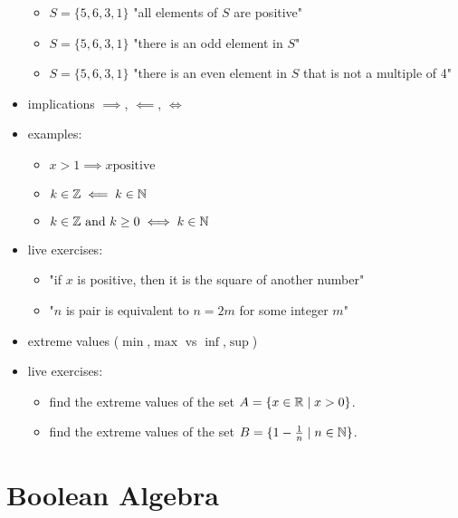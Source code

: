 \begin{itemize}
  \begin{itemize}
  \tightlist
  \item
    \(S = \{5,6,3,1\}\) "all elements of \(S\) are positive"
  \item
    \(S = \{5,6,3,1\}\) "there is an odd element in \(S\)"
  \item
    \(S = \{5,6,3,1\}\) "there is an even element in \(S\) that is not a
    multiple of 4"
  \end{itemize}
\item
  implications \(\implies\), \(\impliedby\), \(\iff\)
\item
  examples:

  \begin{itemize}
  \tightlist
  \item
    \(x>1 \implies x \text{positive}\)
  \item
    \(k \in \mathbb{Z} \impliedby k \in \mathbb{N}\)
  \item
    \(k \in \mathbb{Z}  \text{ and } k\geq 0 \iff k \in \mathbb{N}\)
  \end{itemize}
\item
  live exercises:

  \begin{itemize}
  \tightlist
  \item
    "if \(x\) is positive, then it is the square of another number"
  \item
    "\(n\) is pair is equivalent to \(n=2m\) for some integer \(m\)"
  \end{itemize}
\item
  extreme values (\(\min\),\(\max\) vs \(\inf\),\(\sup\))
\item
  live exercises:

  \begin{itemize}
  \tightlist
  \item
    find the extreme values of the set \(A = \{x \in \mathbb{R} \mid x>0\}\).
  \item
    find the extreme values of the set
    \(B = \{1-\frac{1}{n} \mid n\in \mathbb{N}\}\).
  \end{itemize}
\end{itemize}

\hypertarget{boolean-algebra}{%
\section{Boolean Algebra}\label{boolean-algebra}}

